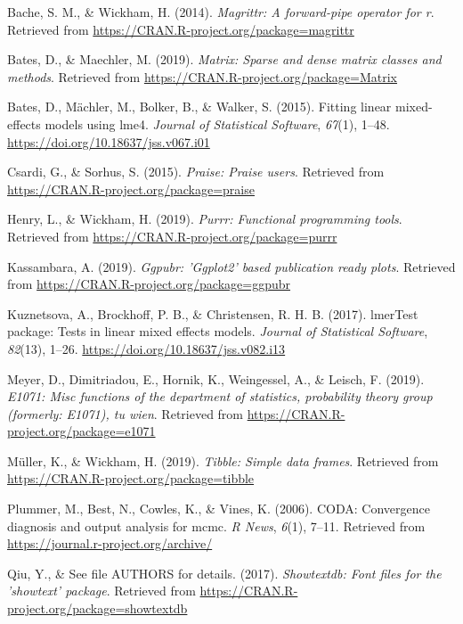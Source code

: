 \documentclass[english,man,floatsintext]{apa6}
\begin{document}
\leavevmode\hypertarget{ref-R-magrittr}{}%
Bache, S. M., \& Wickham, H. (2014). \emph{Magrittr: A forward-pipe operator for r}. Retrieved from \url{https://CRAN.R-project.org/package=magrittr}

\leavevmode\hypertarget{ref-R-Matrix}{}%
Bates, D., \& Maechler, M. (2019). \emph{Matrix: Sparse and dense matrix classes and methods}. Retrieved from \url{https://CRAN.R-project.org/package=Matrix}

\leavevmode\hypertarget{ref-R-lme4}{}%
Bates, D., Mächler, M., Bolker, B., \& Walker, S. (2015). Fitting linear mixed-effects models using lme4. \emph{Journal of Statistical Software}, \emph{67}(1), 1--48. \url{https://doi.org/10.18637/jss.v067.i01}

\leavevmode\hypertarget{ref-R-praise}{}%
Csardi, G., \& Sorhus, S. (2015). \emph{Praise: Praise users}. Retrieved from \url{https://CRAN.R-project.org/package=praise}

\leavevmode\hypertarget{ref-R-purrr}{}%
Henry, L., \& Wickham, H. (2019). \emph{Purrr: Functional programming tools}. Retrieved from \url{https://CRAN.R-project.org/package=purrr}

\leavevmode\hypertarget{ref-R-ggpubr}{}%
Kassambara, A. (2019). \emph{Ggpubr: 'Ggplot2' based publication ready plots}. Retrieved from \url{https://CRAN.R-project.org/package=ggpubr}

\leavevmode\hypertarget{ref-R-lmerTest}{}%
Kuznetsova, A., Brockhoff, P. B., \& Christensen, R. H. B. (2017). lmerTest package: Tests in linear mixed effects models. \emph{Journal of Statistical Software}, \emph{82}(13), 1--26. \url{https://doi.org/10.18637/jss.v082.i13}

\leavevmode\hypertarget{ref-R-e1071}{}%
Meyer, D., Dimitriadou, E., Hornik, K., Weingessel, A., \& Leisch, F. (2019). \emph{E1071: Misc functions of the department of statistics, probability theory group (formerly: E1071), tu wien}. Retrieved from \url{https://CRAN.R-project.org/package=e1071}

\leavevmode\hypertarget{ref-R-tibble}{}%
Müller, K., \& Wickham, H. (2019). \emph{Tibble: Simple data frames}. Retrieved from \url{https://CRAN.R-project.org/package=tibble}

\leavevmode\hypertarget{ref-R-coda}{}%
Plummer, M., Best, N., Cowles, K., \& Vines, K. (2006). CODA: Convergence diagnosis and output analysis for mcmc. \emph{R News}, \emph{6}(1), 7--11. Retrieved from \url{https://journal.r-project.org/archive/}

\leavevmode\hypertarget{ref-R-showtextdb}{}%
Qiu, Y., \& See file AUTHORS for details. (2017). \emph{Showtextdb: Font files for the 'showtext' package}. Retrieved from \url{https://CRAN.R-project.org/package=showtextdb}
\end{document}

